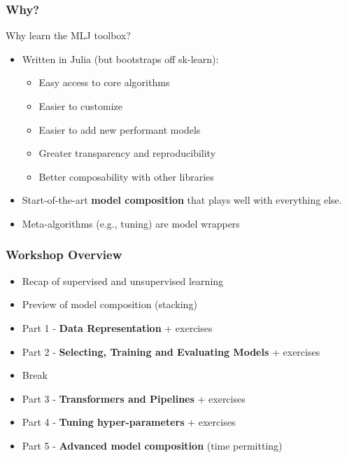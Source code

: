 \documentclass[t]{beamer}
\newcommand\df{\bf\color{Maroon}}
\begin{document}
\begin{frame}
  \frametitle{Why?}
  \begin{block}{Why learn the MLJ toolbox?}
    \begin{itemize}
    \item Written in Julia (but bootstraps off sk-learn):\pause
      \begin{itemize}
      \item Easy access to core algorithms
      \item Easier to customize
      \item Easier to add new performant models
      \item Greater transparency and reproducibility
      \item Better composability with other libraries\pause
      \end{itemize}
    \item Start-of-the-art {\df model composition} that plays well with everything else.
    \item Meta-algorithms (e.g., tuning) are model wrappers
    \end{itemize}
  \end{block}
\end{frame}



\begin{frame}
  \frametitle{Workshop Overview}
  \begin{itemize}

  \item Recap of supervised and unsupervised learning

  \item Preview of model composition (stacking)

  \item Part 1 - {\df Data Representation} + exercises

  \item Part 2 - {\df Selecting, Training and Evaluating Models} + exercises

  \item  Break 

  \item Part 3 - {\df Transformers and Pipelines} + exercises

  \item Part 4 - {\df Tuning hyper-parameters} + exercises

  \item Part 5 - {\df Advanced model composition} (time permitting)

  \end{itemize}
\end{frame}
\end{document}
